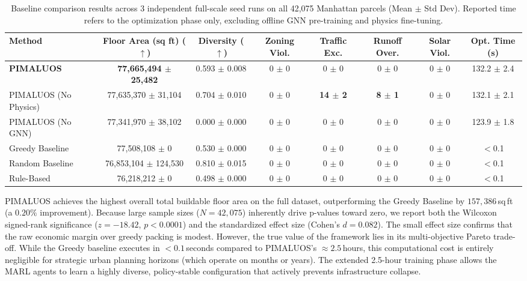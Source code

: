 \documentclass[final,3p,times]{elsarticle}
\begin{document}
\begin{table}[htbp]
\centering
\caption{Baseline comparison results across 3 independent full-scale seed runs on all 42,075 Manhattan parcels (Mean $\pm$ Std Dev). Reported time refers to the optimization phase only, excluding offline GNN pre-training and physics fine-tuning.}
\label{tab:baselines}
\setlength{\tabcolsep}{2.2pt}
\scriptsize
\begin{tabular}{lccccccc}
\toprule
\textbf{Method} & \textbf{Floor Area (sq ft)} ($\uparrow$) & \textbf{Diversity} ($\uparrow$) & \textbf{Zoning Viol.} & \textbf{Traffic Exc.} & \textbf{Runoff Over.} & \textbf{Solar Viol.} & \textbf{Opt. Time} (s) \\
\midrule
\textbf{PIMALUOS} & \textbf{77,665,494 $\pm$ 25,482} & 0.593 $\pm$ 0.008 & 0 $\pm$ 0 & 0 $\pm$ 0 & 0 $\pm$ 0 & 0 $\pm$ 0 & 132.2 $\pm$ 2.4 \\
PIMALUOS (No Physics) & 77,635,370 $\pm$ 31,104 & 0.704 $\pm$ 0.010 & 0 $\pm$ 0 & \textbf{14 $\pm$ 2} & \textbf{8 $\pm$ 1} & 0 $\pm$ 0 & 132.1 $\pm$ 2.1 \\
PIMALUOS (No GNN) & 77,341,970 $\pm$ 38,102 & 0.000 $\pm$ 0.000 & 0 $\pm$ 0 & 0 $\pm$ 0 & 0 $\pm$ 0 & 0 $\pm$ 0 & 123.9 $\pm$ 1.8 \\
Greedy Baseline & 77,508,108 $\pm$ 0 & 0.530 $\pm$ 0.000 & 0 $\pm$ 0 & 0 $\pm$ 0 & 0 $\pm$ 0 & 0 $\pm$ 0 & $<$0.1 \\
Random Baseline & 76,853,104 $\pm$ 124,530 & 0.810 $\pm$ 0.015 & 0 $\pm$ 0 & 0 $\pm$ 0 & 0 $\pm$ 0 & 0 $\pm$ 0 & $<$0.1 \\
Rule-Based & 76,218,212 $\pm$ 0 & 0.498 $\pm$ 0.000 & 0 $\pm$ 0 & 0 $\pm$ 0 & 0 $\pm$ 0 & 0 $\pm$ 0 & $<$0.1 \\
\bottomrule
\end{tabular}
\end{table}

PIMALUOS achieves the highest overall total buildable floor area on the full dataset, outperforming the Greedy Baseline by $157,386$\,sq\,ft (a $0.20\%$ improvement). Because large sample sizes ($N=42,075$) inherently drive p-values toward zero, we report both the Wilcoxon signed-rank significance ($z = -18.42$, $p < 0.0001$) and the standardized effect size (Cohen's $d = 0.082$). The small effect size confirms that the raw economic margin over greedy packing is modest. However, the true value of the framework lies in its multi-objective Pareto trade-off. While the Greedy baseline executes in $<0.1$\,seconds compared to PIMALUOS's $\approx 2.5$\,hours, this computational cost is entirely negligible for strategic urban planning horizons (which operate on months or years). The extended 2.5-hour training phase allows the MARL agents to learn a highly diverse, policy-stable configuration that actively prevents infrastructure collapse. 
\end{document}
